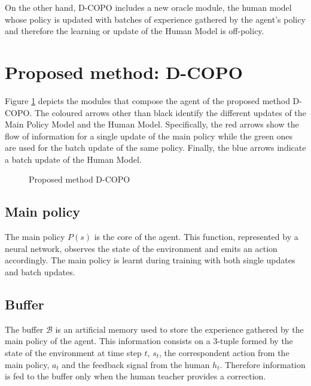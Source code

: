 On the other hand, D-COPO includes a new oracle module, the human model whose policy is updated with batches of experience gathered by the agent's policy and therefore the learning or update of the Human Model is off-policy.


\vspace{10mm} 


\section{Proposed method: D-COPO}
\label{section:Proposed method: D-COPO}

Figure \ref{fig:method_diagram} depicts the modules that compose the agent of the proposed method D-COPO. The coloured arrows other than black identify the different updates of the Main Policy Model and the Human Model. Specifically, the red arrows show the flow of information for a single update of the main policy while the green ones are used for the batch update of the same policy. Finally, the blue arrows indicate a batch update of the Human Model. 



\begin{figure}[H]
    \centering
    
    \caption{Proposed method D-COPO}
    \label{fig:method_diagram}
\end{figure}

\subsection*{Main policy}

The main policy $P(s)$ is the core of the agent. This function, represented by a neural network, observes the state of the environment and emits an action accordingly. The main policy is learnt during training with both single updates and batch updates. 


\subsection*{Buffer}
The buffer $\mathcal{B}$ is an artificial memory  used to store the experience gathered by the main policy of the agent. This information consists on a 3-tuple formed by the state of the environment at time step $t$,  $s_t$, the correspondent action from the main policy, $a_t$ and the feedback signal from the human $h_t$. Therefore information is fed to the buffer only when the human teacher provides a correction.

